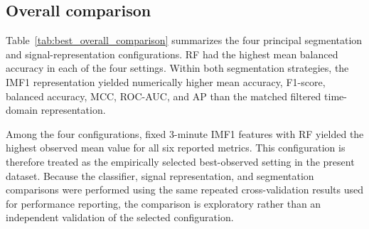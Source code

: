\documentclass[10pt,letterpaper]{article}
\begin{document}
\begin{table}[!htbp]
\centering
\caption{\textbf{Recording-level classification performance for fixed 3-minute segmentation using matched filtered time-domain EHG features.} Values are means across 30 complete repetition-level out-of-fold evaluations. Preterm delivery was treated as the positive class.}
\label{tab:fixed_raw}
\end{table}
\FloatBarrier

\subsection*{Overall comparison}

Table~\ref{tab:best_overall_comparison} summarizes the four principal segmentation and signal-representation configurations. RF had the highest mean balanced accuracy in each of the four settings. Within both segmentation strategies, the IMF1 representation yielded numerically higher mean accuracy, F1-score, balanced accuracy, MCC, ROC-AUC, and AP than the matched filtered time-domain representation.

Among the four configurations, fixed 3-minute IMF1 features with RF yielded the highest observed mean value for all six reported metrics. This configuration is therefore treated as the empirically selected best-observed setting in the present dataset. Because the classifier, signal representation, and segmentation comparisons were performed using the same repeated cross-validation results used for performance reporting, the comparison is exploratory rather than an independent validation of the selected configuration.
\end{document}
